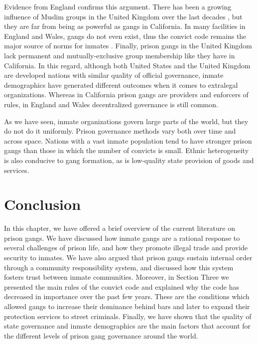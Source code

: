 \documentclass[a4paper, 12pt]{article}
\begin{document}
Evidence from England confirms this argument. There has been a growing influence of Muslim groups in the United Kingdom over the last decades \citep{hm2010muslim}, but they are far from being as powerful as gangs in California. In many facilities in England and Wales, gangs do not even exist, thus the convict code remains the major source of norms for inmates \citep{crewe2009prisoner,liebling2004prisons}. Finally, prison gangs in the United Kingdom lack permanent and mutually-exclusive group membership like they have in California. In this regard, although both United States and the United Kingdom are developed nations with similar quality of official governance, inmate demographics have generated different outcomes when it comes to extralegal organizations. Whereas in California prison gangs are providers and enforcers of rules, in England and Wales decentralized governance is still common.

As we have seen, inmate organizations govern large parts of the world, but they do not do it uniformly. Prison governance methods vary both over time and across space. Nations with a vast inmate population tend to have stronger prison gangs than those in which the number of convicts is small. Ethnic heterogeneity is also conducive to gang formation, as is low-quality state provision of goods and services.  

\section{Conclusion}
\label{sec:conclusion} 

In this chapter, we have offered a brief overview of the current literature on prison gangs. We have discussed how inmate gangs are a rational response to several challenges of prison life, and how they promote illegal trade and provide security to inmates. We have also argued that prison gangs sustain internal order through a community responsibility system, and discussed how this system fosters trust between inmate communities. Moreover, in Section Three we presented the main rules of the convict code and explained why the code has decreased in importance over the past few years. These are the conditions which allowed gangs to increase their dominance behind bars and later to expand their protection services to street criminals. Finally, we have shown that the quality of state governance and inmate demographics are the main factors that account for the different levels of prison gang governance around the world.
\end{document}
